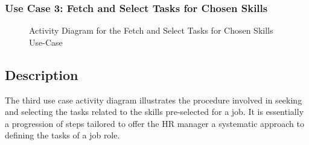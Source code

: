 \subsubsection{Use Case 3: Fetch and Select Tasks for Chosen Skills} 
\begin{figure}[H]
    \centering
    \caption{ Activity Diagram for the Fetch and Select Tasks for Chosen Skills Use-Case }
    \label{fig:UseCase3Sprint2_Activity_Diagram}
\end{figure}

\subsection*{Description}
The third use case activity diagram illustrates the procedure involved in seeking and selecting the tasks related to the skills pre-selected for a job. It is essentially a progression of steps tailored to offer the HR manager a systematic approach to defining the tasks of a job role.

